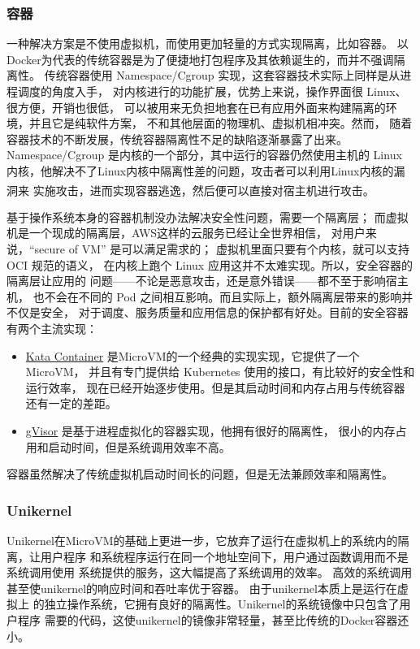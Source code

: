 \documentclass[UTF8,fontset=none,linespread=1.15]{ctexart}
\let\nosupcite\cite
\renewcommand*{\cite}[1]{\textsuperscript{\nosupcite{#1}}}
\begin{document}
\subsubsection{容器}
一种解决方案是不使用虚拟机，而使用更加轻量的方式实现隔离，比如容器。
以Docker为代表的传统容器是为了便捷地打包程序及其依赖诞生的，而并不强调隔离性。
传统容器使用 Namespace/Cgroup 实现，这套容器技术实际上同样是从进程调度的角度入手，
对内核进行的功能扩展，优势上来说，操作界面很 Linux、很方便，开销也很低，
可以被用来无负担地套在已有应用外面来构建隔离的环境，并且它是纯软件方案，
不和其他层面的物理机、虚拟机相冲突。然而，
随着容器技术的不断发展，传统容器隔离性不足的缺陷逐渐暴露了出来。
Namespace/Cgroup 是内核的一个部分，其中运行的容器仍然使用主机的 Linux 内核，他解决不了Linux内核中隔离性差的问题，攻击者可以利用Linux内核的漏洞来
实施攻击，进而实现容器逃逸，然后便可以直接对宿主机进行攻击。\cite{bib:docker-security-selinux}

基于操作系统本身的容器机制没办法解决安全性问题，需要一个隔离层；
而虚拟机是一个现成的隔离层，AWS这样的云服务已经让全世界相信，
对用户来说，“secure of VM” 是可以满足需求的；
虚拟机里面只要有个内核，就可以支持 OCI 规范的语义，
在内核上跑个 Linux 应用这并不太难实现。所以，安全容器的隔离层让应用的
问题——不论是恶意攻击，还是意外错误——都不至于影响宿主机，
也不会在不同的 Pod 之间相互影响。而且实际上，额外隔离层带来的影响并不仅是安全，
对于调度、服务质量和应用信息的保护都有好处。目前的安全容器有两个主流实现：
\begin{itemize}
\item \href{https://github.com/kata-containers/kata-containers}{Kata Container} 是MicroVM的一个经典的实现实现，它提供了一个MicroVM，
并且有专门提供给 Kubernetes 使用的接口，有比较好的安全性和运行效率，
现在已经开始逐步使用。但是其启动时间和内存占用与传统容器还有一定的差距。
\item  \href{https://github.com/google/gvisor}{gVisor} 是基于进程虚拟化的容器实现，他拥有很好的隔离性，
很小的内存占用和启动时间，但是系统调用效率不高。
\end{itemize}

容器虽然解决了传统虚拟机启动时间长的问题，但是无法兼顾效率和隔离性。

\subsubsection{Unikernel}
Unikernel在MicroVM的基础上更进一步，它放弃了运行在虚拟机上的系统内的隔离，让用户程序
和系统程序运行在同一个地址空间下，用户通过函数调用而不是系统调用使用
系统提供的服务，这大幅提高了系统调用的效率。
高效的系统调用甚至使unikernel的响应时间和吞吐率优于容器。
由于unikernel本质上是运行在虚拟上
的独立操作系统，它拥有良好的隔离性。Unikernel的系统镜像中只包含了用户程序
需要的代码，这使unikernel的镜像非常轻量，甚至比传统的Docker容器还小。
\end{document}
